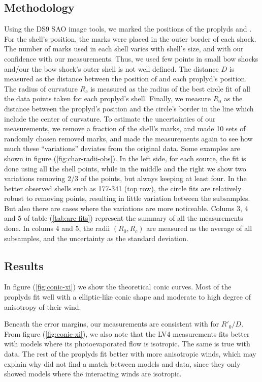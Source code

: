 \subsection{Methodology}
\label{sec:methodology}
Using the DS9 SAO image tools, we marked the positions of the proplyds and \thC{}. For the shell's position, the marks were placed in the outer border of each shock. 
The number of marks used in each shell varies with shell's size, and with our confidence with our measurements.
Thus, we used few points in small bow shocks and/our the bow shock's outer shell is not well defined. The distance $D$ is measured as the distance between the position of \thC{} 
and each proplyd's position. The radius of curvature $R_c$ is measured as the radius of the 
best circle fit of all the data points taken for each proplyd's shell. Finally, we measure $R_0$ as the distance between the proplyd's position and the circle's border in the line which 
include the center of curvature.
To estimate the uncertainties of our measurements, we remove a fraction of the shell's marks, and made 10 sets of randomly chosen removed marks, and made the measurements again to 
see how much these ``variations'' deviates from the original data. Some examples are shown  in figure (\ref{fig:char-radii-obs}).  In the left side, for each source, 
the fit is done using all the shell points, while in the middle and the right we show two variations removing 2/3 of the points, but always keeping at least four. 
In the better observed shells such as 177-341 (top row), the circle
fits are relatively robust to removing points, resulting in little variation between the subsamples. 
But also there are cases where the variations are more noticeable. Colums 3, 4 and 5 of table (\ref{tab:arc-fits}) represent the summary of all the measurements done. In colums 4 and 5, 
the radii $(R_0,R_c)$ are measured as the average of all subsamples, and the uncertainty as the standard deviation.
\subsection{Results}
\label{sec:results}
In figure (\ref{fig:conic-xi}) we show the theoretical conic curves. Most of the proplyds fit well 
with a elliptic-like conic shape and moderate to high degree of anisotropy of their wind.

Beneath the error margins, our measurements are consistent with \citet{Robberto:2005} for $R'_0/D$. From figure (\ref{fig:conic-xi}), we also
note that the LV4 measurements fits better with models where its photoevaporated flow is isotropic. The same is true with \citet{Robberto:2005} data.
The rest of the proplyds fit better with more anisotropic winds, which may explain why \citet{Robberto:2005} did not find a match between models
and data, since they only showed models where the interacting winds are isotropic.

